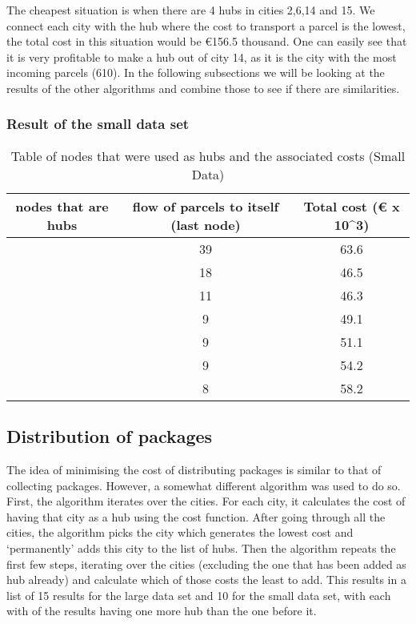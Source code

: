 \documentclass{article}
\begin{document}
The cheapest situation is when there are 4 hubs in cities 2,6,14 and 15. We connect each city with the hub where the cost to transport a parcel is the lowest, the total cost in this situation would be €156.5 thousand. One can easily see that it is very profitable to make a hub out of city 14, as it is the city with the most incoming parcels (610). In the following subsections we will be looking at the results of the other algorithms and combine those to see if there are similarities.
\subsubsection{Result of the small data set}

        \begin{table}[h!]
            \begin{tabular}{||c|c|c||}
                \hline
                nodes that are hubs & flow of parcels to itself (last node) & Total cost (€ x 10^3)\\
                \hline
                [2] &  39 & 63.6\\
                \hline
                [2,6]   & 18 & 46.5 \\
                \hline
                [2,6,4] & 11 & 46.3 \\
                \hline
                [2,6,4,3]  & 9 & 49.1  \\
                \hline
                [2,6,4,3,7] & 9 & 51.1 \\
                \hline
                [2,6,4,3,7,9] & 9 & 54.2   \\
                \hline
                [2,6,4,3,7,9,5] & 8 & 58.2 \\
                \hline
            \end{tabular}
        \caption{Table of nodes that were used as hubs and the associated costs (Small Data)}
        \end{table}

\subsection{Distribution of packages}
\label{Distribution}
The idea of minimising the cost of distributing packages is similar to that of collecting packages. However, a somewhat different algorithm was used to do so. First, the algorithm iterates over the cities. For each city, it calculates the cost of having that city as a hub using the cost function. After going through all the cities, the algorithm picks the city which generates the lowest cost and `permanently' adds this city to the list of hubs. Then the algorithm repeats the first few steps, iterating over the cities (excluding the one that has been added as hub already) and calculate which of those costs the least to add. This results in a list of 15 results for the large data set and 10 for the small data set, with each with of the results having one more hub than the one before it. 
\end{document}

